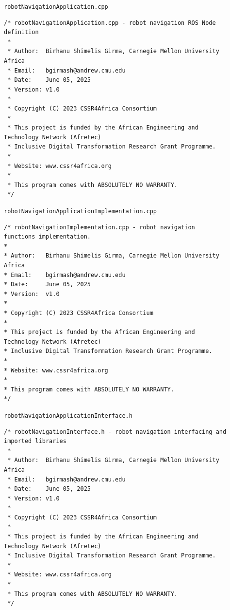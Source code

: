 \documentclass{CSSRforAfrica}
\newcommand{\checkboxChecked}{\fbox{\ding{51}}} %
\begin{document}
\begin{description}

\item[\checkboxChecked] {\small \verb+robotNavigationApplication.cpp+}

{\scriptsize \begin{verbatim}
/* robotNavigationApplication.cpp - robot navigation ROS Node definition
 *
 * Author:  Birhanu Shimelis Girma, Carnegie Mellon University Africa
 * Email:   bgirmash@andrew.cmu.edu
 * Date:    June 05, 2025
 * Version: v1.0
 *
 * Copyright (C) 2023 CSSR4Africa Consortium
 *
 * This project is funded by the African Engineering and Technology Network (Afretec)
 * Inclusive Digital Transformation Research Grant Programme.
 *
 * Website: www.cssr4africa.org
 *
 * This program comes with ABSOLUTELY NO WARRANTY.
 */
\end{verbatim} }

\item[\checkboxChecked]  {\small \verb+robotNavigationApplicationImplementation.cpp+}

{\scriptsize \begin{verbatim}
/* robotNavigationImplementation.cpp - robot navigation functions implementation.
*
* Author:   Birhanu Shimelis Girma, Carnegie Mellon University Africa
* Email:    bgirmash@andrew.cmu.edu
* Date:     June 05, 2025
* Version:  v1.0
*
* Copyright (C) 2023 CSSR4Africa Consortium
*
* This project is funded by the African Engineering and Technology Network (Afretec)
* Inclusive Digital Transformation Research Grant Programme.
*
* Website: www.cssr4africa.org
*
* This program comes with ABSOLUTELY NO WARRANTY.
*/
\end{verbatim} }

\item[\checkboxChecked] {\small \verb+robotNavigationApplicationInterface.h+}

{\scriptsize \begin{verbatim}
/* robotNavigationInterface.h - robot navigation interfacing and imported libraries
 *
 * Author:  Birhanu Shimelis Girma, Carnegie Mellon University Africa
 * Email:   bgirmash@andrew.cmu.edu
 * Date:    June 05, 2025
 * Version: v1.0
 *
 * Copyright (C) 2023 CSSR4Africa Consortium
 *
 * This project is funded by the African Engineering and Technology Network (Afretec)
 * Inclusive Digital Transformation Research Grant Programme.
 *
 * Website: www.cssr4africa.org
 *
 * This program comes with ABSOLUTELY NO WARRANTY.
 */
\end{verbatim} }

\end{description} 
\end{document}
